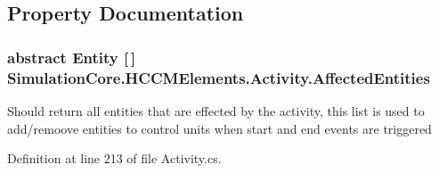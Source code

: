 \subsection{Property Documentation}
\subsubsection[{\texorpdfstring{Affected\+Entities}{AffectedEntities}}]{\setlength{\rightskip}{0pt plus 5cm}abstract {\bf Entity} \mbox{[}$\,$\mbox{]} Simulation\+Core.\+H\+C\+C\+M\+Elements.\+Activity.\+Affected\+Entities\hspace{0.3cm}{\ttfamily [get]}}\hypertarget{class_simulation_core_1_1_h_c_c_m_elements_1_1_activity_af07550055be1462a61509685122e3c8a}{}\label{class_simulation_core_1_1_h_c_c_m_elements_1_1_activity_af07550055be1462a61509685122e3c8a}


Should return all entities that are effected by the activity, this list is used to add/remoove entities to control units when start and end events are triggered 



Definition at line 213 of file Activity.\+cs.

